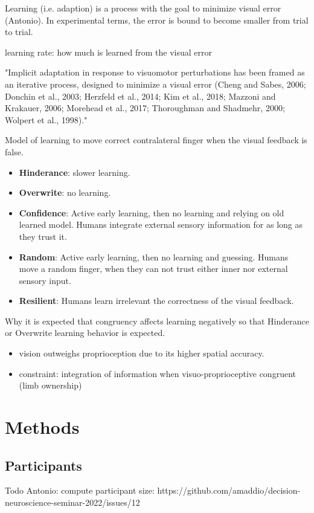 \documentclass[man]{apa7}
\begin{document}
Learning (i.e. adaption) is a process with the goal to minimize visual error (Antonio). In experimental terms, the error is bound to become smaller from trial to trial.

learning rate: how much is learned from the visual error

"Implicit adaptation in response to visuomotor perturbations has been framed as an iterative process, designed to minimize a visual error (Cheng and Sabes, 2006; Donchin et al., 2003; Herzfeld et al., 2014; Kim et al., 2018; Mazzoni and Krakauer, 2006; Morehead et al., 2017; Thoroughman and Shadmehr, 2000; Wolpert et al., 1998)." \parencite{Tsay2022}

Model of learning to move correct contralateral finger when the visual feedback is false.
\begin{itemize}
    \item \textbf{Hinderance}: slower learning.
    \item \textbf{Overwrite}: no learning.
    \item \textbf{Confidence}: Active early learning, then no learning and relying on old learned model. Humans integrate external sensory information for as long as they trust it.
    \item \textbf{Random}: Active early learning, then no learning and guessing. Humans move a random finger, when they can not trust either inner nor external sensory input.
    \item \textbf{Resilient}: Humans learn irrelevant the correctness of the visual feedback.
\end{itemize}

Why it is expected that congruency affects learning negatively so that Hinderance or Overwrite learning behavior is expected.

\begin{itemize}
    \item vision outweighs proprioception due to its higher spatial accuracy.
    \item constraint: integration of information when visuo-proprioceptive congruent (limb ownership)
\end{itemize}

\parencite{Limanowski2016}


\section{Methods}
\subsection{Participants}
Todo Antonio: compute participant size: https://github.com/amaddio/decision-neuroscience-seminar-2022/issues/12
\end{document}
